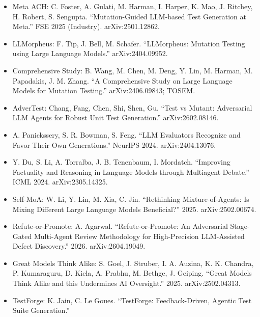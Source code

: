 \documentclass[
  11pt,
]{article}
\begin{document}
\begin{itemize}
\item
  Meta ACH: C. Foster, A. Gulati, M. Harman, I. Harper, K. Mao, J.
  Ritchey, H. Robert, S. Sengupta. ``Mutation-Guided LLM-based Test
  Generation at Meta.'' FSE 2025 (Industry). arXiv:2501.12862.
\item
  LLMorpheus: F. Tip, J. Bell, M. Schafer. ``LLMorpheus: Mutation
  Testing using Large Language Models.'' arXiv:2404.09952.
\item
  Comprehensive Study: B. Wang, M. Chen, M. Deng, Y. Lin, M. Harman, M.
  Papadakis, J. M. Zhang. ``A Comprehensive Study on Large Language
  Models for Mutation Testing.'' arXiv:2406.09843; TOSEM.
\item
  AdverTest: Chang, Fang, Chen, Shi, Shen, Gu. ``Test vs Mutant:
  Adversarial LLM Agents for Robust Unit Test Generation.''
  arXiv:2602.08146.
\item
  A. Panickssery, S. R. Bowman, S. Feng. ``LLM Evaluators Recognize and
  Favor Their Own Generations.'' NeurIPS 2024. arXiv:2404.13076.
\item
  Y. Du, S. Li, A. Torralba, J. B. Tenenbaum, I. Mordatch. ``Improving
  Factuality and Reasoning in Language Models through Multiagent
  Debate.'' ICML 2024. arXiv:2305.14325.
\item
  Self-MoA: W. Li, Y. Lin, M. Xia, C. Jin. ``Rethinking
  Mixture-of-Agents: Is Mixing Different Large Language Models
  Beneficial?'' 2025. arXiv:2502.00674.
\item
  Refute-or-Promote: A. Agarwal. ``Refute-or-Promote: An Adversarial
  Stage-Gated Multi-Agent Review Methodology for High-Precision
  LLM-Assisted Defect Discovery.'' 2026. arXiv:2604.19049.
\item
  Great Models Think Alike: S. Goel, J. Struber, I. A. Auzina, K. K.
  Chandra, P. Kumaraguru, D. Kiela, A. Prabhu, M. Bethge, J. Geiping.
  ``Great Models Think Alike and this Undermines AI Oversight.'' 2025.
  arXiv:2502.04313.
\item
  TestForge: K. Jain, C. Le Goues. ``TestForge: Feedback-Driven, Agentic
  Test Suite Generation.''


\end{itemize}
\end{document}
